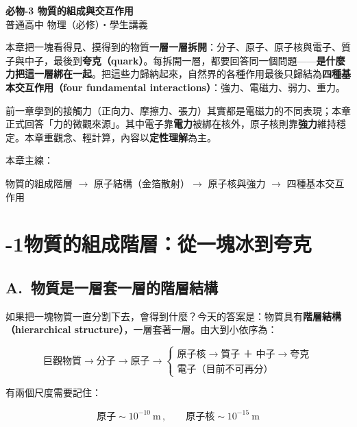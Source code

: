 \documentclass[11pt]{article}
\begin{document}
\begin{center}
{\sffamily\Huge\bfseries 必物-3 物質的組成與交互作用}\\[3pt]
{\sffamily\large 普通高中 物理（必修）・學生講義}
\end{center}
\vspace{0.6em}

本章把一塊看得見、摸得到的物質\textbf{一層一層拆開}：分子、原子、原子核與電子、質子與中子，最後到\textbf{夸克（quark）}。每拆開一層，都要回答同一個問題——\textbf{是什麼力把這一層綁在一起}。把這些力歸納起來，自然界的各種作用最後只歸結為\textbf{四種基本交互作用（four fundamental interactions）}：強力、電磁力、弱力、重力。

前一章學到的接觸力（正向力、摩擦力、張力）其實都是電磁力的不同表現；本章正式回答「力的微觀來源」。其中電子靠\textbf{電力}被綁在核外，原子核則靠\textbf{強力}維持穩定。本章重觀念、輕計算，內容以\textbf{定性理解}為主。

\medskip
本章主線：

\begin{center}
物質的組成階層 $\rightarrow$ 原子結構（金箔散射）$\rightarrow$ 原子核與強力 $\rightarrow$ 四種基本交互作用
\end{center}

\section*{-1\quad 物質的組成階層：從一塊冰到夸克}

\subsection*{\sffamily A.\ 物質是一層套一層的階層結構}

如果把一塊物質一直分割下去，會得到什麼？今天的答案是：物質具有\textbf{階層結構（hierarchical structure）}，一層套著一層。由大到小依序為：

$$\text{巨觀物質}\to\text{分子}\to\text{原子}\to
\begin{cases}\text{原子核}\to\text{質子 ＋ 中子}\to\text{夸克}\\[2pt]\text{電子（目前不可再分）}\end{cases}$$


有兩個尺度需要記住：

$$\boxed{\;\text{原子}\sim 10^{-10}\ \text{m}\,,\qquad \text{原子核}\sim 10^{-15}\ \text{m}\;}$$
\end{document}
